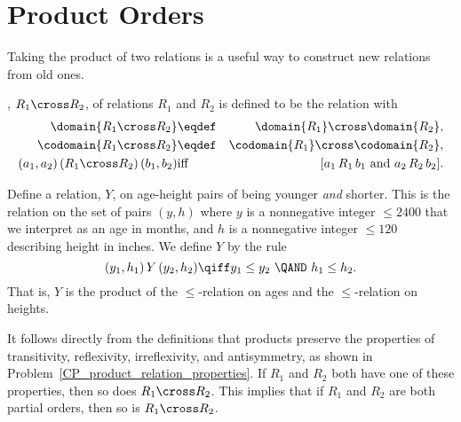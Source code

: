 \begin{problems}
\practiceproblems
{}

\classproblems
{}

\homeworkproblems
{}

\examproblems
{}

\end{problems}


\section{Product Orders}\label{prodsec}

Taking the product of two relations is a useful way to construct new
relations from old ones.

\begin{definition}\label{productrel}
, $R_1 \cross R_2$, of relations
$R_1$ and $R_2$ is defined to be the relation with
\begin{eqnarray*}
\domain{R_1 \cross R_2} &\eqdef& \domain{R_1} \cross \domain{R_2},\\
\codomain{R_1 \cross R_2} &\eqdef& \codomain{R_1} \cross \codomain{R_2},\\
(a_1,a_2)\, (R_1 \cross R_2)\, (b_1,b_2) &\text{iff}& [a_1\, R_1\, b_1
\text{ and } a_2\, R_2\, b_2].
\end{eqnarray*}

\end{definition}

\begin{example}\label{Y}
Define a relation, $Y$, on age-height pairs of being younger \emph{and}
shorter.  This is the relation on the set of pairs $(y,h)$ where $y$ is a
nonnegative integer $\le 2400$ that we interpret as an age in months, and $h$
is a nonnegative integer $\le 120$ describing height in inches.  We define $Y$
by the rule
\[
(y_1,h_1)\, Y\, (y_2,h_2) \qiff y_1 \le y_2\ \QAND\ h_1 \le h_2.
\]
That is, $Y$ is the product of the $\le$-relation on ages and the
$\le$-relation on heights.
\end{example}

It follows directly from the definitions that products preserve the
properties of transitivity, reflexivity, irreflexivity, and
antisymmetry, as shown in
Problem~\ref{CP_product_relation_properties}.  If $R_1$ and
$R_2$ both have one of these properties, then so does $R_1 \cross
R_2$.  This implies that if $R_1$ and $R_2$ are both partial orders,
then so is $R_1 \cross R_2$.

